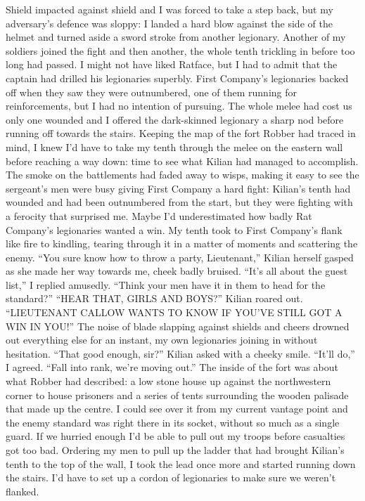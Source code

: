 \documentclass[12pt, openany]{book}
\begin{document}
Shield impacted against shield and I was forced to take a step back, but my adversary’s defence was sloppy: I landed a hard blow against the side of the helmet and turned aside a sword stroke from another legionary. Another of my soldiers joined the fight and then another, the whole tenth trickling in before too long had passed. I might not have liked Ratface, but I had to admit that the captain had drilled his legionaries superbly. First Company’s legionaries backed off when they saw they were outnumbered, one of them running for reinforcements, but I had no intention of pursuing. The whole melee had cost us only one wounded and I offered the dark-skinned legionary a sharp nod before running off towards the stairs. Keeping the map of the fort Robber had traced in mind, I knew I’d have to take my tenth through the melee on the eastern wall before reaching a way down: time to see what Kilian had managed to accomplish. The smoke on the battlements had faded away to wisps, making it easy to see the sergeant’s men were busy giving First Company a hard fight: Kilian’s tenth had wounded and had been outnumbered from the start, but they were fighting with a ferocity that surprised me. Maybe I’d underestimated how badly Rat Company’s legionaries wanted a win. My tenth took to First Company’s flank like fire to kindling, tearing through it in a matter of moments and scattering the enemy.
“You sure know how to throw a party, Lieutenant,” Kilian herself gasped as she made her way towards me, cheek badly bruised.
“It’s all about the guest list,” I replied amusedly. “Think your men have it in them to head for the standard?”
“HEAR THAT, GIRLS AND BOYS?” Kilian roared out. “LIEUTENANT CALLOW WANTS TO KNOW IF YOU’VE STILL GOT A WIN IN YOU!”
The noise of blade slapping against shields and cheers drowned out everything else for an instant, my own legionaries joining in without hesitation.
“That good enough, sir?” Kilian asked with a cheeky smile.
“It’ll do,” I agreed. “Fall into rank, we’re moving out.”
The inside of the fort was about what Robber had described: a low stone house up against the northwestern corner to house prisoners and a series of tents surrounding the wooden palisade that made up the centre. I could see over it from my current vantage point and the enemy standard was right there in its socket, without so much as a single guard. If we hurried enough I’d be able to pull out my troops before casualties got too bad. Ordering my men to pull up the ladder that had brought Kilian’s tenth to the top of the wall, I took the lead once more and started running down the stairs. I’d have to set up a cordon of legionaries to make sure we weren’t flanked.
\end{document}
